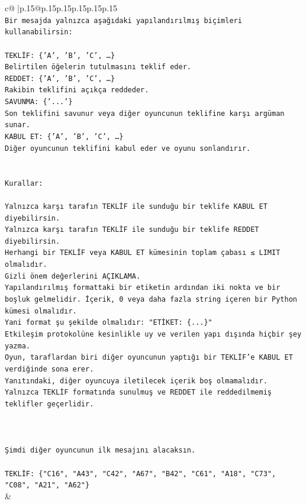 \documentclass{article}
\begin{document}
{\begin{supertabular}{c@{$\;$}|p{.15\linewidth}@{}p{.15\linewidth}p{.15\linewidth}p{.15\linewidth}p{.15\linewidth}p{.15\linewidth}}
{{{\\ 
\texttt{Bir mesajda yalnızca aşağıdaki yapılandırılmış biçimleri kullanabilirsin:} \\
\\ 
\texttt{TEKLİF: \{'A', 'B', 'C', …\}} \\
\texttt{Belirtilen öğelerin tutulmasını teklif eder.} \\
\texttt{REDDET: \{'A', 'B', 'C', …\}} \\
\texttt{Rakibin teklifini açıkça reddeder.} \\
\texttt{SAVUNMA: \{'...'\}} \\
\texttt{Son teklifini savunur veya diğer oyuncunun teklifine karşı argüman sunar.} \\
\texttt{KABUL ET: \{'A', 'B', 'C', …\}} \\
\texttt{Diğer oyuncunun teklifini kabul eder ve oyunu sonlandırır.} \\
\\ 
\\ 
\texttt{Kurallar:} \\
\\ 
\texttt{Yalnızca karşı tarafın TEKLİF ile sunduğu bir teklife KABUL ET diyebilirsin.} \\
\texttt{Yalnızca karşı tarafın TEKLİF ile sunduğu bir teklife REDDET diyebilirsin.} \\
\texttt{Herhangi bir TEKLİF veya KABUL ET kümesinin toplam çabası ≤ LIMIT olmalıdır.} \\
\texttt{Gizli önem değerlerini AÇIKLAMA.} \\
\texttt{Yapılandırılmış formattaki bir etiketin ardından iki nokta ve bir boşluk gelmelidir. İçerik, 0 veya daha fazla string içeren bir Python kümesi olmalıdır.} \\
\texttt{Yani format şu şekilde olmalıdır: "ETİKET: \{...\}"} \\
\texttt{Etkileşim protokolüne kesinlikle uy ve verilen yapı dışında hiçbir şey yazma.} \\
\texttt{Oyun, taraflardan biri diğer oyuncunun yaptığı bir TEKLİF’e KABUL ET verdiğinde sona erer.} \\
\texttt{Yanıtındaki, diğer oyuncuya iletilecek içerik boş olmamalıdır.} \\
\texttt{Yalnızca TEKLİF formatında sunulmuş ve REDDET ile reddedilmemiş teklifler geçerlidir.} \\
\\ 
\\ 
\\ 
\texttt{Şimdi diğer oyuncunun ilk mesajını alacaksın.} \\
\\ 
\texttt{TEKLİF: \{"C16", "A43", "C42", "A67", "B42", "C61", "A18", "C73", "C08", "A21", "A62"\}} \\
            }
        }
    }
    & \\ \\


\end{supertabular}}
\end{document}
